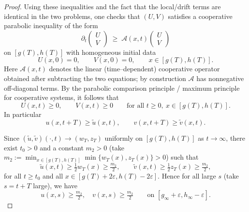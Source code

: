 \documentclass[a4paper,11pt]{amsart}
\theoremstyle{definition}
\numberwithin{equation}{section}
\theoremstyle{definition}
\begin{document}
\begin{proof}
Using these inequalities and the fact that the local/drift terms are identical in the two problems, one checks that \((U,V)\) satisfies a cooperative parabolic inequality of the form
\[
\partial_t
\begin{pmatrix} U\\ V\end{pmatrix}
\;\ge\;
\mathcal A(x,t)\begin{pmatrix} U\\ V\end{pmatrix}
\]
on $[g(T),h(T)]$ with homogeneous initial data
\[
U(x,0)=0,\qquad V(x,0)=0,\qquad x\in[g(T),h(T)].
\]
Here \(\mathcal A(x,t)\) denotes the linear (time–dependent) cooperative operator obtained after subtracting the two equations; by construction \(\mathcal A\) has nonnegative off-diagonal terms. By the parabolic comparison principle / maximum principle for cooperative systems, it follows that
\[
U(x,t)\geq 0,\qquad V(x,t) \geq 0 \qquad\text{for all }t\ge0,\ x\in[g(T),h(T)].
\]
In particular
\[
u(x,t+T)\geq \tilde u(x,t),\qquad v(x,t+T)\geq \tilde v(x,t).
\]

Since \((\tilde u,\tilde v)(\cdot,t)\to (w_T,z_T)\) uniformly on \([g(T),h(T)]\) as \(t\to\infty\), there exist \(t_0>0\) and a constant \(m_2>0\) (take \(m_2:=\min_{x\in[g(T),h(T)]}\min\{w_T(x),z_T(x)\}>0\)) such that
\[
\tilde u(x,t)\geq \tfrac{1}{2}w_T(x)\geq \tfrac{m_2}{2},\qquad
\tilde v(x,t)\geq \tfrac{1}{2}z_T(x)\geq \tfrac{m_2}{2},
\]
for all \(t\ge t_0\) and all \(x\in[g(T)+2\varepsilon,h(T)-2\varepsilon]\). Hence for all large \(s\) (take \(s=t+T\) large), we have
\[
u(x,s)\ge \tfrac{m_2}{2},\quad v(x,s)\ge \tfrac{m_2}{2}
\qquad\text{on }[g_\infty+\varepsilon,h_\infty-\varepsilon].
\]


\end{proof}
\end{document}
